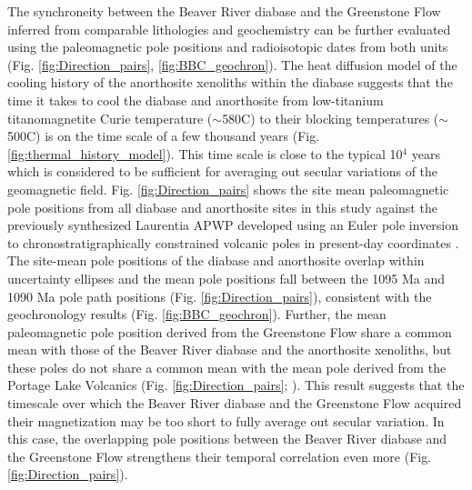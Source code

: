 The synchroneity between the Beaver River diabase and the Greenstone Flow inferred from comparable lithologies and geochemistry can be further evaluated using the paleomagnetic pole positions and radioisotopic dates from both units (Fig. \ref{fig:Direction_pairs}, \ref{fig:BBC_geochron}). The heat diffusion model of the cooling history of the anorthosite xenoliths within the diabase suggests that the time it takes to cool the diabase and anorthosite from low-titanium titanomagnetite Curie temperature ($\sim$580\textdegree C) to their blocking temperatures ($\sim$500\textdegree C) is on the time scale of a few thousand years (Fig. \ref{fig:thermal_history_model}). This time scale is close to the typical 10$^4$ years which is considered to be sufficient for averaging out secular variations of the geomagnetic field. Fig. \ref{fig:Direction_pairs} shows the site mean paleomagnetic pole positions from all diabase and anorthosite sites in this study against the previously synthesized Laurentia APWP developed using an Euler pole inversion to chronostratigraphically constrained volcanic poles in present-day coordinates \citep{Swanson-Hysell2019a}. The site-mean pole positions of the diabase and anorthosite overlap within uncertainty ellipses and the mean pole positions fall between the 1095 Ma and 1090 Ma pole path positions (Fig. \ref{fig:Direction_pairs}), consistent with the geochronology results (Fig. \ref{fig:BBC_geochron}). Further, the mean paleomagnetic pole position derived from the Greenstone Flow share a common mean with those of the Beaver River diabase and the anorthosite xenoliths, but these poles do not share a common mean with the mean pole derived from the Portage Lake Volcanics (Fig. \ref{fig:Direction_pairs}; \citealp{Swanson-Hysell2019a}). This result suggests that the timescale over which the Beaver River diabase and the Greenstone Flow acquired their magnetization may be too short to fully average out secular variation. In this case, the overlapping pole positions between the Beaver River diabase and the Greenstone Flow strengthens their temporal correlation even more (Fig. \ref{fig:Direction_pairs}). 

